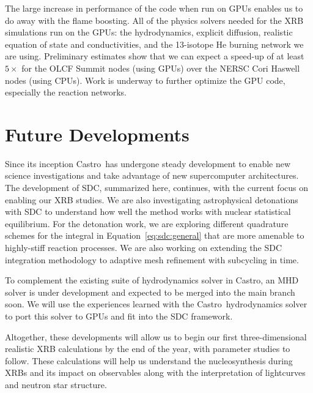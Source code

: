 \documentclass[a4paper]{jpconf}
\newcommand{\castro}{{\sffamily Castro}}
\begin{document}
The large increase in performance of the code when run on GPUs enables
us to do away with the flame boosting.  All of the physics solvers
needed for the XRB simulations run on the GPUs: the hydrodynamics,
explicit diffusion, realistic equation of state and conductivities,
and the 13-isotope He burning network we are using.  Preliminary
estimates show that we can expect a speed-up of at least $5\times$ for the OLCF Summit
nodes (using GPUs) over the NERSC Cori Haswell nodes (using CPUs).
Work is underway to further optimize the GPU code,
especially the reaction networks.


\section{Future Developments}

Since its inception \castro\ has undergone steady development to
enable new science investigations and take advantage of new
supercomputer architectures.  The development of SDC, summarized here,
continues, with the current focus on enabling our XRB studies.  We are
also investigating astrophysical detonations with SDC to understand
how well the method works with nuclear statistical equilibrium.  For
the detonation work, we are exploring different quadrature schemes for
the integral in Equation~\ref{eq:sdc:general} that are more amenable
to highly-stiff reaction processes.  We are also working on extending
the SDC integration methodology to adaptive mesh refinement with
subcycling in time.

To complement the existing suite of hydrodynamics solver in \castro,
an MHD solver is under development and expected to be merged into the
main branch soon.  We will use the experiences learned with the
\castro\ hydrodynamics solver to port this solver to GPUs and fit into
the SDC framework.

Altogether, these developments will allow us to begin our first
three-dimensional realistic XRB calculations by the end of the year,
with parameter studies to follow.  These calculations will help us
understand the nucleosynthesis during XRBs and its impact on
observables along with the interpretation of lightcurves and neutron star
structure.
\end{document}
